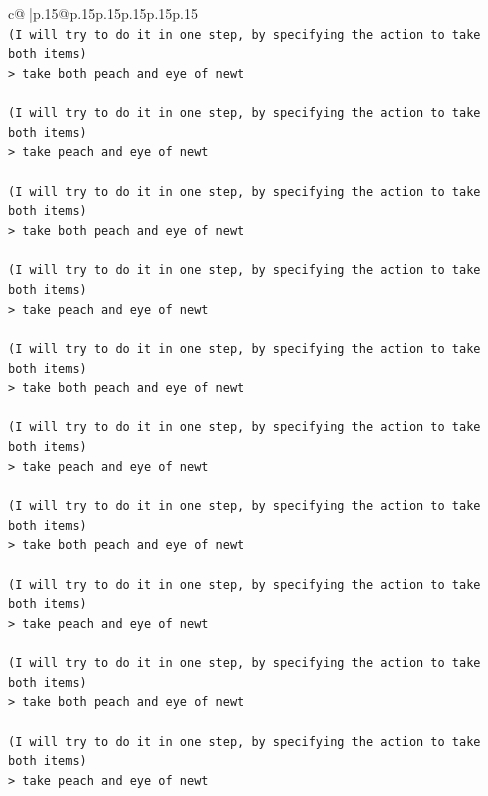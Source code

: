 \documentclass{article}
\begin{document}
{\begin{supertabular}{c@{$\;$}|p{.15\linewidth}@{}p{.15\linewidth}p{.15\linewidth}p{.15\linewidth}p{.15\linewidth}p{.15\linewidth}}
{{{\\ 
\texttt{(I will try to do it in one step, by specifying the action to take both items) } \\
\texttt{> take both peach and eye of newt } \\
\\ 
\texttt{(I will try to do it in one step, by specifying the action to take both items) } \\
\texttt{> take peach and eye of newt } \\
\\ 
\texttt{(I will try to do it in one step, by specifying the action to take both items) } \\
\texttt{> take both peach and eye of newt } \\
\\ 
\texttt{(I will try to do it in one step, by specifying the action to take both items) } \\
\texttt{> take peach and eye of newt } \\
\\ 
\texttt{(I will try to do it in one step, by specifying the action to take both items) } \\
\texttt{> take both peach and eye of newt } \\
\\ 
\texttt{(I will try to do it in one step, by specifying the action to take both items) } \\
\texttt{> take peach and eye of newt } \\
\\ 
\texttt{(I will try to do it in one step, by specifying the action to take both items) } \\
\texttt{> take both peach and eye of newt } \\
\\ 
\texttt{(I will try to do it in one step, by specifying the action to take both items) } \\
\texttt{> take peach and eye of newt } \\
\\ 
\texttt{(I will try to do it in one step, by specifying the action to take both items) } \\
\texttt{> take both peach and eye of newt } \\
\\ 
\texttt{(I will try to do it in one step, by specifying the action to take both items) } \\
\texttt{> take peach and eye of newt } \\
}}}
\end{supertabular}}
\end{document}
